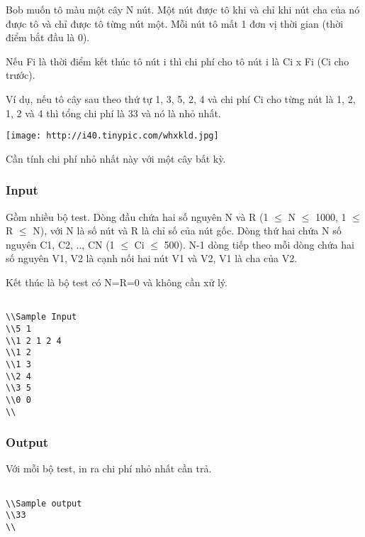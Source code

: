 







   Bob muốn tô màu một cây N nút. Một nút được tô khi và chỉ khi nút cha của nó được tô và chỉ được tô từng nút một. Mỗi nút tô mất 1 đơn vị thời gian (thời điểm bắt đầu là 0).  

   Nếu Fi là thời điểm kết thúc tô nút i thì chi phí cho tô nút i là Ci x Fi (Ci cho trước).  

   Ví dụ, nếu tô cây sau theo thứ tự 1, 3, 5, 2, 4 và chi phí Ci cho từng nút là 1, 2, 1, 2 và 4 thì tổng chi phí là 33 và nó là nhỏ nhất.  

\href{http://tinypic.com}{}


\texttt{[image: http://i40.tinypic.com/whxkld.jpg]}



   Cần tính chi phí nhỏ nhất này với một cây bất kỳ.  

\subsubsection{   Input  }

   Gồm nhiều bộ test. Dòng đầu chứa hai số nguyên N và R (1  $\le$  N  $\le$  1000, 1  $\le$  R  $\le$  N), với N là số nút và R là chỉ số của nút gốc. Dòng thứ hai chứa N số nguyên C1, C2, .., CN (1  $\le$  Ci  $\le$  500). N-1 dòng tiếp theo mỗi dòng chứa hai số nguyên V1, V2 là cạnh nối hai nút V1 và V2, V1 là cha của V2.  

   Kết thúc là bộ test có N=R=0 và không cần xử lý.  
\begin{verbatim}

\\Sample Input
\\5 1 
\\1 2 1 2 4 
\\1 2 
\\1 3 
\\2 4 
\\3 5 
\\0 0 
\\\end{verbatim}

\subsubsection{   Output  }

   Với mỗi bộ test, in ra chi phí nhỏ nhất cần trả.  
\begin{verbatim}

\\Sample output
\\33
\\\end{verbatim}

